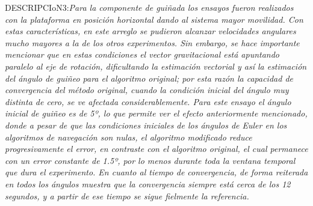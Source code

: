 \documentclass[conference]{IEEEtran}
\begin{document}
DESCRIPCIoN3:\textsl{Para la componente de guiñada los ensayos fueron realizados con la plataforma en posición horizontal dando al sistema mayor movilidad. Con estas características, en este arreglo se pudieron alcanzar velocidades angulares mucho mayores a la de los otros experimentos. Sin embargo, se hace importante mencionar que en estas condiciones el vector gravitacional está apuntando paralelo al eje de rotación, dificultando la estimación vectorial y así la estimación del ángulo de guiñeo para el algoritmo original; por esta razón la capacidad de convergencia del método original, cuando la condición inicial del ángulo muy distinta de cero, se ve afectada considerablemente. Para este ensayo el ángulo inicial de guiñeo es de 5º, lo que permite ver el efecto anteriormente mencionado, donde a pesar de que las condiciones iniciales de los ángulos de Euler en los algoritmos de navegación son nulas, el algoritmo modificado reduce progresivamente el error, en contraste con el algoritmo original, el cual permanece con un error constante de 1.5º, por lo menos durante toda la ventana temporal que dura el experimento. En cuanto al tiempo de convergencia, de forma reiterada en todos los ángulos muestra que la convergencia siempre está cerca de los 12 segundos, y a partir de ese tiempo se sigue fielmente la referencia.}\par
\end{document}
